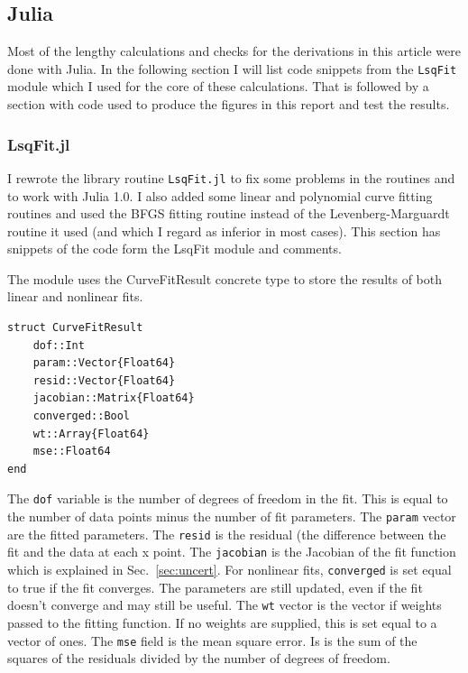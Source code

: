 \documentclass{scrartcl}
\begin{document}
\subsection{Julia}
Most of the lengthy calculations and checks for the derivations
in this article were done with Julia. In the following section
I will list code snippets from the \texttt{LsqFit} module which
I used for the core of these calculations. That is followed
by a section with code used to produce the figures in this
report and test the results.
\subsubsection{LsqFit.jl}
I rewrote the library routine \texttt{LsqFit.jl}
to fix some problems in the routines and to work with
Julia 1.0. I also added some linear and polynomial curve
fitting routines and used the BFGS fitting routine
instead of the Levenberg-Marguardt routine it used (and which
I regard as inferior in most cases). This section has
snippets of the code form the LsqFit module and comments.

The module uses the CurveFitResult concrete type to store
the results of both linear and nonlinear fits.
\begin{lstlisting}
struct CurveFitResult
    dof::Int
    param::Vector{Float64}
    resid::Vector{Float64}
    jacobian::Matrix{Float64}
    converged::Bool
    wt::Array{Float64}
    mse::Float64
end
\end{lstlisting}
The \texttt{dof} variable is the number of degrees of freedom in the fit.
This is equal to the number of data points minus the number of
fit parameters.
The \texttt{param} vector are the fitted parameters. The \texttt{resid}
is the residual (the difference between the fit and the data at each
x point. The \texttt{jacobian} is the Jacobian of the fit function
which is explained in Sec.~\ref{sec:uncert}. For nonlinear fits,
\texttt{converged} is set equal to true if the fit converges. The
parameters are still updated, even if the fit doesn't converge and
may still be useful. The \texttt{wt} vector is the vector if
weights passed to the fitting function. If no weights are supplied,
this is set equal to a vector of ones. The \texttt{mse} field is
the mean square error. Is is the sum of the squares of the residuals
divided by the number of degrees of freedom.
\end{document}
